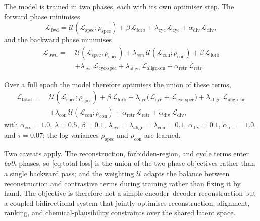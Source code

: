 The model is trained in two phases, each with its own optimiser step. The forward phase minimises
\begin{equation}
    \label{eq:loss-fwd}
    \mathcal{L}_{\mathrm{fwd}} = \mathcal{U}(\mathcal{L}_{\mathrm{spec}};\rho_{\mathrm{spec}}) + \beta\,\mathcal{L}_{\mathrm{forb}} + \lambda_{\mathrm{cyc}}\,\mathcal{L}_{\mathrm{cyc}} + \alpha_{\mathrm{div}}\,\mathcal{L}_{\mathrm{div}},
\end{equation}
and the backward phase minimises
\begin{equation}
    \label{eq:loss-bwd}
    \begin{aligned}
        \mathcal{L}_{\mathrm{bwd}} = \;& \mathcal{U}(\mathcal{L}_{\mathrm{spec}};\rho_{\mathrm{spec}}) + \lambda_{\mathrm{con}}\,\mathcal{U}(\mathcal{L}_{\mathrm{con}};\rho_{\mathrm{con}}) + \beta\,\mathcal{L}_{\mathrm{forb}} \\
        & + \lambda_{\mathrm{cyc}}\,\mathcal{L}_{\text{cyc-spec}} + \lambda_{\text{align}}\,\mathcal{L}_{\text{align-sm}} + \alpha_{\mathrm{retr}}\,\mathcal{L}_{\mathrm{retr}}.
    \end{aligned}
\end{equation}

Over a full epoch the model therefore optimises the union of these terms,
\begin{equation}
    \label{eq:total-loss}
    \begin{aligned}
        \mathcal{L}_{\mathrm{total}} = \;& \mathcal{U}(\mathcal{L}_{\mathrm{spec}};\rho_{\mathrm{spec}}) + \beta\,\mathcal{L}_{\mathrm{forb}} + \lambda_{\mathrm{cyc}}\bigl(\mathcal{L}_{\mathrm{cyc}} + \mathcal{L}_{\text{cyc-spec}}\bigr) + \lambda_{\text{align}}\,\mathcal{L}_{\text{align-sm}} \\
        & + \lambda_{\mathrm{con}}\,\mathcal{U}(\mathcal{L}_{\mathrm{con}};\rho_{\mathrm{con}}) + \alpha_{\mathrm{retr}}\,\mathcal{L}_{\mathrm{retr}} + \alpha_{\mathrm{div}}\,\mathcal{L}_{\mathrm{div}},
    \end{aligned}
\end{equation}
with $\alpha_{\cos}=1.0$, $\lambda=0.5$, $\beta=0.1$, $\lambda_{\mathrm{cyc}}=\lambda_{\text{align}}=\lambda_{\mathrm{con}}=0.1$, $\alpha_{\mathrm{div}}=0.1$, $\alpha_{\mathrm{retr}}=1.0$, and $\tau=0.07$; the log-variances $\rho_{\mathrm{spec}}$ and $\rho_{\mathrm{con}}$ are learned.

Two caveats apply.
The reconstruction, forbidden-region, and cycle terms enter \emph{both} phases, so \cref{eq:total-loss} is the union of the two phase objectives rather than a single backward pass; and the weighting $\mathcal{U}$ adapts the balance between reconstruction and contrastive terms during training rather than fixing it by hand.
The objective is therefore not a simple encoder--decoder reconstruction but a coupled bidirectional system that jointly optimises reconstruction, alignment, ranking, and chemical-plausibility constraints over the shared latent space.

